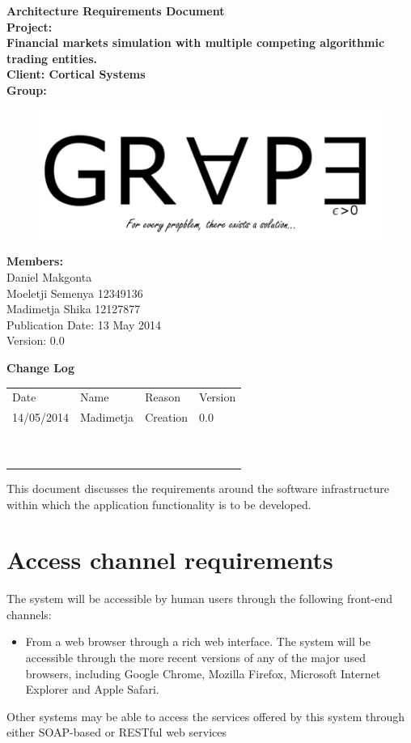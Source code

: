 \documentclass[12pt]{article}
\newcommand{\Title}{Architecture Requirements Document} %
\begin{document}
	\begin{center}%
		\LARGE \bf \Title \\[3em]
		\Large {Project:}\\
		Financial markets simulation with multiple competing algorithmic trading entities.\\[0.7em]
		\Large {Client:}
		Cortical Systems\\[2em]
		\LARGE {\bf Group:}\\
			\begin{figure}[ht!]
				\centering
				\includegraphics[scale=0.4]{Logo8.png}
			\end{figure}
			
		\Large {\bf Members:}\\[0.3em]
		\large
		Daniel Makgonta \\
		Moeletji Semenya 12349136\\
		Madimetja Shika 12127877\\[3em]
	
	\small Publication Date: 13 May 2014\\[0.5em]
	\small Version: 0.0 		    
	\end{center}%
	
	\newpage		
	\LARGE 
 	{\bf Change Log}\\[1em]
	\begin{tabular}{llll}
		Date & Name & Reason & Version \\
		14/05/2014 & Madimetja & Creation & 0.0 \\
		~ & ~ & ~ & ~ \\
		~ & ~ & ~ & ~ \\
	\end{tabular}
	

	\newpage
	\tableofcontents
				  
	\newpage
	This document discusses the requirements around the software infrastructure within which the application functionality is to be developed. 
	\section{Access channel requirements}
	The system will be accessible by human users through the following front-end channels:
	\begin{itemize}
	\item From a web browser through a rich web interface. The system will be accessible through the more recent versions of any of the major used browsers, including Google Chrome, Mozilla Firefox, Microsoft Internet Explorer and Apple Safari.
	\end{itemize}
	Other systems may be able to access the services offered by this system through either SOAP-based or RESTful web services
	
\end{document}

